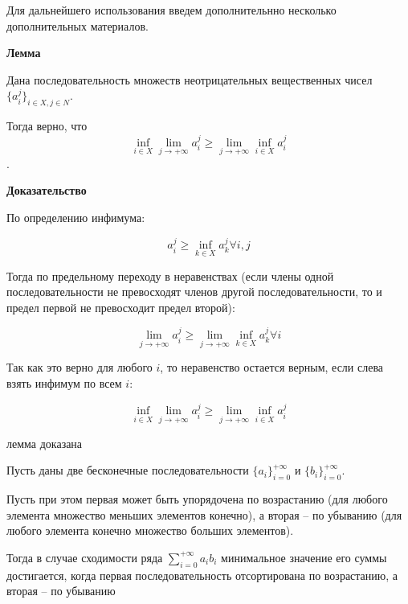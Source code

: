 

Для дальнейшего использования введем дополнительнно несколько дополнительных материалов.

\textbf{Лемма}

Дана последовательность множеств неотрицательных вещественных чисел $\{a_i^j\}_{i \in X, j \in N}$.

Тогда верно, что $$\inf_{i \in X} \lim_{j \to +\infty} a_i^j \ge \lim_{j \to +\infty} \inf_{i \in X} a_i^j$$.

\textbf{Доказательство}

По определению инфимума:

$$a_i^j \ge \inf_{k \in X} a_k^j \forall i, j$$

Тогда по предельному переходу в неравенствах (если члены одной последовательности не превосходят членов другой последовательности, то и предел первой не превосходит предел второй):

$$\lim_{j \to +\infty} a_i^j \ge \lim_{j \to +\infty} \inf_{k \in X} a_k^j \forall i$$

Так как это верно для любого $i$, то неравенство остается верным, если слева взять инфимум по всем $i$:

$$\inf_{i \in X} \lim_{j \to +\infty} a_i^j \ge \lim_{j \to +\infty} \inf_{i \in X} a_i^j$$

лемма доказана

\begin{myth}
Пусть даны две бесконечные последовательности $\{a_i\}_{i = 0}^{+\infty}$ и $\{b_i\}_{i = 0}^{+\infty}$.

Пусть при этом первая может быть упорядочена по возрастанию (для любого элемента множество меньших элементов конечно), а вторая -- по убыванию (для любого элемента конечно множество больших элементов).

Тогда в случае сходимости ряда $\sum_{i = 0}^{+\infty} a_i b_i$ минимальное значение его суммы достигается, когда первая последовательность отсортирована по возрастанию, а вторая -- по убыванию
\end{myth}


